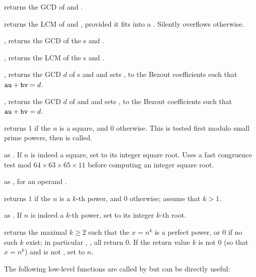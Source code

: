  returns the GCD of  and .

 returns the LCM of  and ,
provided it fits into a . Silently overflows otherwise.

, returns the GCD of the s  and
.

, returns the LCM of the s  and
.

, returns the GCD $d$ of
s  and  and sets ,  to the Bezout
coefficients such that ${\tt au} + {\tt bv} = d$.

, returns the GCD
$d$ of  and  and sets ,  to the Bezout coefficients
such that ${\tt au} + {\tt bv} = d$.


 returns $1$ if the  $n$ is
a square, and $0$ otherwise. This is tested first modulo small prime
powers, then  is called.

 as . If
$n$ is indeed a square, set  to its integer square root.
Uses a fast congruence test mod $64\times 63\times 65\times 11$ before
computing an integer square root.

 as ,
for an  operand .

 returns $1$ if the  $n$ is a
$k$-th power, and $0$ otherwise; assume that $k > 1$.

 as . If
$n$ is indeed a $k$-th power, set  to its integer $k$-th root.

 returns the maximal $k\geq 2$  such
that the  $x = n^k$ is a perfect power, or $0$ if no such $k$ exist;
in particular , ,  all
return 0. If the return value $k$ is not $0$ (so that $x = n^k$) and
 is not , set  to $n$.

The following low-level functions are called by  but can
be directly useful:

